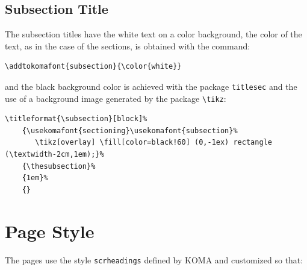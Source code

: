 \documentclass[a4paper,
                             twoside,
                             BCOR1.0cm,
                             DIV11,
                             parskip=full,
                             11pt]{scrbook}
\begin{document}
\subsection{Subsection Title}\label{sbsec:subsectit}
The subsection titles have the white text on a color background, the color of the text, as in the case of the sections, is obtained with the command:
\begin{scriptsize}
\begin{verbatim}
\addtokomafont{subsection}{\color{white}}
\end{verbatim}
\end{scriptsize}
and the black background color is achieved with the package \verb+titlesec+ and the use of a background image generated by the package \verb+\tikz+:
\begin{tiny}
\begin{verbatim}
\titleformat{\subsection}[block]%              
    {\usekomafont{sectioning}\usekomafont{subsection}% 
       \tikz[overlay] \fill[color=black!60] (0,-1ex) rectangle (\textwidth-2cm,1em);}%  
    {\thesubsection}%                   
    {1em}%
    {}
\end{verbatim}
\end{tiny}

\section{Page Style} \label{sec:pagstyle}
The pages use the style \verb+scrheadings+ defined by KOMA and customized so that:
\end{document}
